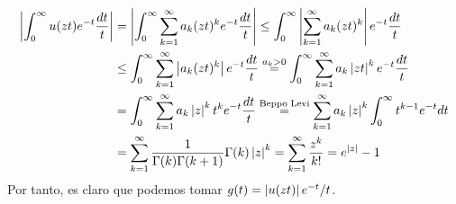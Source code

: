 \documentclass[twoside]{article}
\begin{document}
\begin{ejercicio}{6}
\begin{solucion}
\begin{nota}
\begin{align*}
\left\lvert\int_0^\infty u(zt)e^{-t}\frac{dt}{t}\right\rvert &= \left\lvert\int_0^\infty \sum_{k=1}^\infty a_k (zt)^k e^{-t}\frac{dt}{t}\right\rvert \leq \int_0^\infty \left\lvert \sum_{k=1}^\infty a_k (zt)^k\right\rvert e^{-t}\frac{dt}{t} \\
&\leq \int_0^\infty  \sum_{k=1}^\infty \left\lvert a_k (zt)^k \right\rvert e^{-t}\frac{dt}{t} \overset{a_k>0}{=} \int_0^\infty  \sum_{k=1}^\infty a_k \left\lvert zt\right\rvert^k e^{-t}\frac{dt}{t} \\ 
&=\int_0^\infty  \sum_{k=1}^\infty a_k \left\lvert z\right\rvert^k{t}^k e^{-t}\frac{dt}{t} \overset{\text{Beppo Levi}}{=} \sum_{k=1}^\infty a_k \left\lvert z\right\rvert^k  \int_0^\infty t^{k-1}e^{-t}dt\\
&= \sum_{k=1}^\infty \frac{1}{\Gamma(k)\Gamma(k+1)} \Gamma(k) \left\lvert z\right\rvert^k =  \sum_{k=1}^\infty \frac{z^k}{k!} = e^{\left\lvert z\right\rvert} -1
\end{align*}
Por tanto, es claro que podemos tomar $g(t)=\left\lvert u(zt)\right\rvert e^{-t}/t$.
\end{nota}
\end{solucion}
\end{ejercicio}
\end{document}
